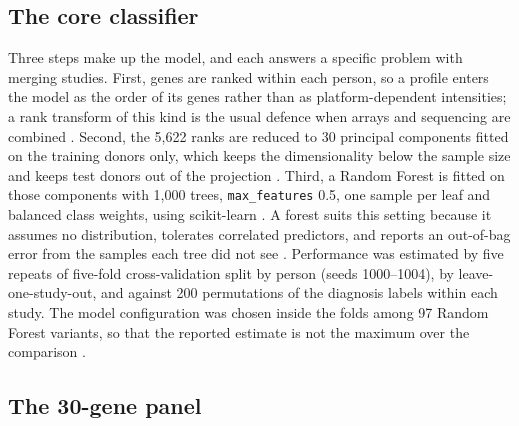 \documentclass[11pt,a4paper]{article}
\begin{document}


\subsection{The core classifier}

Three steps make up the model, and each answers a specific problem with merging studies. First, genes are
ranked within each person, so a profile enters the model as the order of its genes rather than as
platform-dependent intensities; a rank transform of this kind is the usual defence when arrays and sequencing
are combined \citep{leek2010}. Second, the 5,622 ranks are reduced to 30 principal components fitted on the
training donors only, which keeps the dimensionality below the sample size and keeps test donors out of the
projection \citep{ambroise2002}. Third, a Random Forest \citep{breiman2001} is fitted on those components with
1,000 trees, \texttt{max\_features} 0.5, one sample per leaf and balanced class weights, using scikit-learn
\citep{pedregosa2011}. A forest suits this setting because it assumes no distribution, tolerates correlated
predictors, and reports an out-of-bag error from the samples each tree did not see \citep{breiman2001}. Performance was estimated by
five repeats of five-fold cross-validation split by person (seeds 1000--1004), by leave-one-study-out, and
against 200 permutations of the diagnosis labels within each study. The model configuration was chosen inside
the folds among 97 Random Forest variants, so that the reported estimate is not the maximum over the
comparison \citep{varma2006}.

\subsection{The 30-gene panel}
\end{document}
